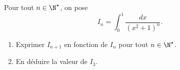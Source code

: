 Pour tout $n \in \N^{\star}$, on pose \[ I_n= \int_0^1 \frac{dx}{(x^2+1)^n}.\]
\begin{enumerate}
\item Exprimer $I_{n+1}$ en fonction de $I_n$ pour tout $n \in \N^{\star}$.
\item En déduire la valeur de $I_3$.
\end{enumerate}